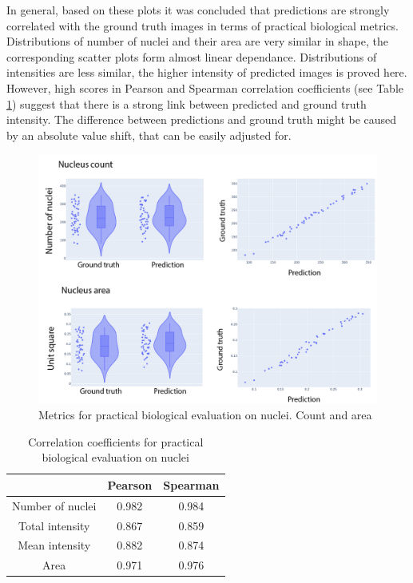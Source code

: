 In general, based on these plots it was concluded that predictions are strongly correlated with the ground truth images in terms of practical biological metrics. Distributions of number of nuclei and their area are very similar in shape, the corresponding scatter plots form almost linear dependance. Distributions of intensities are less similar, the higher intensity of predicted images is proved here. However, high scores in Pearson and Spearman correlation coefficients (see Table \ref{table:nuclei-downstream-metrics-coefficients}) suggest that there is a strong link between predicted and ground truth intensity. The difference between predictions and ground truth might be caused by an absolute value shift, that can be easily adjusted for.

\begin{figure}[htb]
	\begin{center}
		\includegraphics[width=0.8\linewidth]{bilder/nuclei/metric/combined-metrics-1.png}
		\caption{Metrics for practical biological evaluation on nuclei. Count and area}\label{fig:nuclei-downstream-metrics-2}
	\end{center}
\end{figure}

\begin{table}[htb]
    \centering
    \caption{Correlation coefficients for practical biological evaluation on nuclei}
        \begin{adjustbox}{width=0.4\textwidth}
            \begin{tabular}{|c|c|c|}\hline
                &Pearson&Spearman
                \\\hline\hline
                Number of nuclei&0.982&0.984\\\hline
                Total intensity&0.867&0.859\\\hline
                Mean intensity&0.882&0.874\\\hline
                Area&0.971&0.976\\\hline
            \end{tabular}
        \label{table:nuclei-downstream-metrics-coefficients}
        \end{adjustbox}
\end{table}

